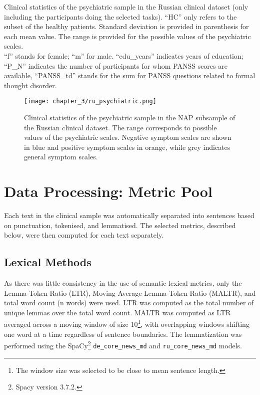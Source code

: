 \begin{table}[ht]
\caption[Russian Clinical Dataset: Psychiatric Scores]{\label{tab:data:ru:sample:psy} Clinical statistics of the psychiatric sample in the Russian clinical dataset (only including the participants doing the selected tasks). ``HC'' only refers to the subset of the healthy patients. Standard deviation is provided in parenthesis for each mean value. The range is provided for the possible values of the psychiatric scales. \\ ``f'' stands for female; ``m'' for male. ``edu\_years'' indicates years of education; ``P\_N'' indicates the number of participants for whom PANSS scores are available, ``PANSS\_td'' stands for the sum for PANSS questions related to formal thought disorder.}
\end{table}

\begin{figure}[ht!]
\begin{center}
    \texttt{[image: chapter\_3/ru\_psychiatric.png]}  
\captionsetup{width=\textwidth}
\caption[Russian Clinical Dataset: Psychiatric Scores]{\label{fig:data:ru:sample:psy} Clinical statistics of the psychiatric sample in the NAP subsample of the Russian clinical dataset. The range corresponds to possible values of the psychiatric scales. Negative symptom scales are shown in blue and positive symptom scales in orange, while grey indicates general symptom scales.}
\end{center}
\end{figure}


\section{Data Processing: Metric Pool}
\label{sec:methods:processing:metrics}

Each text in the clinical sample was automatically separated into sentences based on punctuation, tokenised, and lemmatised. The selected metrics, described below, were then computed for each text separately. 

\subsection{Lexical Methods}
As there was little consistency in the use of semantic lexical metrics, only the Lemma-Token Ratio (LTR), Moving Average Lemma-Token Ratio (MALTR), and total word count (n words) were used. LTR was computed as the total number of unique lemmas over the total word count. MALTR was computed as LTR averaged across a moving window of size 10\footnote{The window size was selected to be close to mean sentence length.}, with overlapping windows shifting one word at a time regardless of sentence boundaries. The lemmatization was performed using the SpaCy\footnote{Spacy version 3.7.2.} \texttt{de\_core\_news\_md} and \texttt{ru\_core\_news\_md} models.

